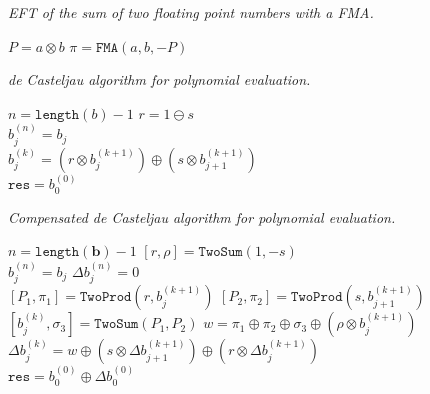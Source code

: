 \documentclass[letterpaper,10pt]{article}
\begin{document}
\begin{algorithm}[H]
  \caption{\textit{EFT of the sum of two floating point numbers with a FMA.}}

  \begin{algorithmic}
      \State \(P = a \otimes b\)
      \State \(\pi = \mathtt{FMA}(a, b, -P)\)
    \EndFunction
  \end{algorithmic}
\end{algorithm}

\begin{algorithm}[H]
  \caption{\textit{de Casteljau algorithm for polynomial evaluation.}}

  \begin{algorithmic}
      \State \(n = \texttt{length}(b) - 1\)
      \State \(r = 1 \ominus s\)
      \\
        \State \(b_j^{(n)} = b_j\)
      \EndFor
      \\
          \State \(b_j^{(k)} = \left(r \otimes b_j^{(k + 1)}\right) \oplus
              \left(s \otimes b_{j + 1}^{(k + 1)}\right)\)
        \EndFor
      \EndFor
      \\
      \State \(\mathtt{res} = b_0^{(0)}\)
    \EndFunction
  \end{algorithmic}
\end{algorithm}

\begin{algorithm}[H]
  \caption{\textit{Compensated de Casteljau algorithm for polynomial evaluation.}}

  \begin{algorithmic}
      \State \(n = \texttt{length}(\mathbf{b}) - 1\)
      \State \(\left[r, \rho\right] = \mathtt{TwoSum}(1, -s)\)
      \\
        \State \(b_j^{(n)} = b_j\)
        \State \(\Delta b_j^{(n)} = 0\)
      \EndFor
      \\
          \State \(\left[P_1, \pi_1\right] = \mathtt{TwoProd}\left(
              r, b_j^{(k + 1)}\right)\)
          \State \(\left[P_2, \pi_2\right] = \mathtt{TwoProd}\left(
              s, b_{j + 1}^{(k + 1)}\right)\)
          \State \(\left[b_j^{(k)}, \sigma_3\right] = \mathtt{TwoSum}(
              P_1, P_2)\)
          \State \(w = \pi_1 \oplus \pi_2 \oplus \sigma_3 \oplus
              \left(\rho \otimes b_j^{(k + 1)}\right)\)
          \State \(\Delta b_j^{(k)} = w \oplus \left(s \otimes
              \Delta b_{j + 1}^{(k + 1)}
              \right) \oplus \left(r \otimes \Delta b_j^{(k + 1)}\right)\)
        \EndFor
      \EndFor
      \\
      \State \(\mathtt{res} = b_0^{(0)} \oplus \Delta b_0^{(0)}\)
    \EndFunction
  \end{algorithmic}
\end{algorithm}
\end{document}
